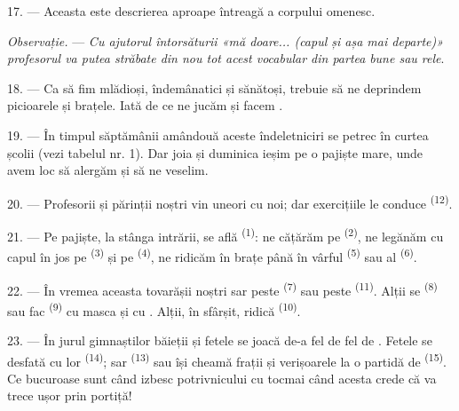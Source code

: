 17. --- Aceasta este descrierea aproape întreagă a corpului omenesc.

\textit{Observație.} --- \textit{Cu ajutorul întorsăturii «mă doare... (capul și
așa mai departe)» profesorul va putea străbate din nou tot acest vocabular din
partea}  \textit{bune sau rele}.

\VUsaut{5.0mm}
\VUsaut{2.4mm}
\VUsaut{3.0mm}

18. --- Ca să fim mlădioși, îndemânatici și sănătoși, trebuie să ne deprindem
picioarele și brațele. Iată de ce ne jucăm și facem .

19. --- În timpul săptămânii amândouă aceste îndeletniciri se petrec în curtea
școlii (vezi tabelul nr. 1). Dar joia și duminica ieșim pe o pajiște mare, unde
avem loc să alergăm și să ne veselim.

20. --- Profesorii și părinții noștri vin uneori cu noi; dar exercițiile le
conduce  \textsuperscript{(12)}.

21. --- Pe pajiște, la stânga intrării, se află 
\textsuperscript{(1)}: ne cățărăm pe  \textsuperscript{(2)}, ne
legănăm cu capul în jos pe  \textsuperscript{(3)} și pe
 \textsuperscript{(4)}, ne ridicăm în brațe până în vârful
 \textsuperscript{(5)} sau al  \textsuperscript{(6)}.

22. --- În vremea aceasta tovarășii noștri sar peste 
\textsuperscript{(7)} sau peste  \textsuperscript{(11)}. Alții se
 \textsuperscript{(8)} sau fac 
\textsuperscript{(9)} cu masca și cu . Alții, în sfârșit, ridică
 \textsuperscript{(10)}.

\VUsaut{4.6mm}
\VUsaut{3.0mm}

23. --- În jurul gimnaștilor băieții și fetele se joacă de-a fel de fel de
. Fetele se desfată cu  lor \textsuperscript{(14)};
sar  \textsuperscript{(13)} sau își cheamă frații și verișoarele la
o partidă de  \textsuperscript{(15)}. Ce bucuroase sunt când
izbesc  potrivnicului cu  tocmai când
acesta crede că va trece ușor prin portiță!

